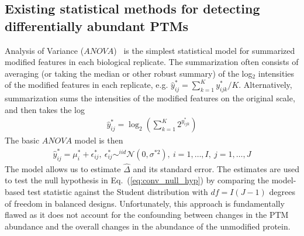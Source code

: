 \documentclass[mcp]{article}
\numberwithin{table}{section}
\def\eqref#1{Eq.~(\ref{eq:#1})}
\begin{document}
\subsection*{Existing statistical methods for detecting differentially abundant PTMs}


\medskip \noindent 

Analysis of Variance ($ANOVA$)~\cite{kutner_etal_04a} is the simplest statistical model for summarized modified features in each biological replicate. The summarization often consists of averaging (or taking the median or other robust summary) of the log$_2$ intensities of the modified features in each replicate, e.g. $\hat{y}^*_{ij} = \sum_{k=1}^K{y_{ijk}^{\ast}}/K$. Alternatively, summarization sums the intensities of the modified features on the original scale, and then takes the log
\begin{eqnarray}
\hat{y}^*_{ij} =  \log_2 \left(\sum_{k=1}^{K} 2^{y_{ijk}^{\ast}}\right)
\label{eq:anova_summ}
\end{eqnarray}
The basic $ANOVA$ model  is then
\begin{eqnarray}
\hat{y}^*_{ij} = \mu^{*}_{i} + \epsilon^{\ast}_{ij}, \ \epsilon^{\ast}_{ij} \mathop\sim^{iid} \mathcal{N}(0, \sigma^{*2}),\ i=1,\ldots,I,\ j=1,\ldots,J
\label{eq:ttest_model}
\end{eqnarray}
The model allows us to estimate $\hat{\Delta}$ and its standard error. The estimates are used to test the null hypothesis in \eqref{conv_null_hyp} by comparing the model-based test statistic against the Student distribution with $df=I(J-1)$ degrees of freedom in balanced designs.
Unfortunately, this approach is fundamentally flawed as it does not account for the confounding between changes in the PTM abundance and the overall changes in the abundance of the unmodified protein.

\medskip \noindent 

\end{document}
